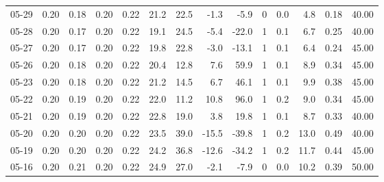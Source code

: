\begin{threeparttable}
{\begin{tabular}{lrrrrrrrrrrrrr}
  05-29 &          0.20 &          0.18 &          0.20 &        0.22 &                21.2 &                22.5 &       -1.3 &         -5.9 &              0 &                 0.0 &              4.8 &            0.18 &                  40.00 \\
  05-28 &          0.20 &          0.17 &          0.20 &        0.22 &                19.1 &                24.5 &       -5.4 &        -22.0 &              1 &                 0.1 &              6.7 &            0.25 &                  40.00 \\
  05-27 &          0.20 &          0.17 &          0.20 &        0.22 &                19.8 &                22.8 &       -3.0 &        -13.1 &              1 &                 0.1 &              6.4 &            0.24 &                  45.00 \\
  05-26 &          0.20 &          0.18 &          0.20 &        0.22 &                20.4 &                12.8 &        7.6 &         59.9 &              1 &                 0.1 &              8.9 &            0.34 &                  45.00 \\
  05-23 &          0.20 &          0.18 &          0.20 &        0.22 &                21.2 &                14.5 &        6.7 &         46.1 &              1 &                 0.1 &              9.9 &            0.38 &                  45.00 \\
  05-22 &          0.20 &          0.19 &          0.20 &        0.22 &                22.0 &                11.2 &       10.8 &         96.0 &              1 &                 0.2 &              9.0 &            0.34 &                  45.00 \\
  05-21 &          0.20 &          0.19 &          0.20 &        0.22 &                22.8 &                19.0 &        3.8 &         19.8 &              1 &                 0.1 &              8.7 &            0.33 &                  40.00 \\
  05-20 &          0.20 &          0.20 &          0.20 &        0.22 &                23.5 &                39.0 &      -15.5 &        -39.8 &              1 &                 0.2 &             13.0 &            0.49 &                  40.00 \\
  05-19 &          0.20 &          0.20 &          0.20 &        0.22 &                24.2 &                36.8 &      -12.6 &        -34.2 &              1 &                 0.2 &             11.7 &            0.44 &                  45.00 \\
  05-16 &          0.20 &          0.21 &          0.20 &        0.22 &                24.9 &                27.0 &       -2.1 &         -7.9 &              0 &                 0.0 &             10.2 &            0.39 &                  50.00 \\

\end{tabular}}
\end{threeparttable}
